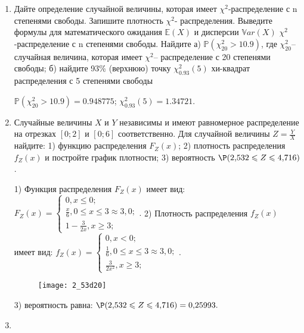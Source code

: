 \documentclass[a4paper,12pt]{article}
\begin{document}
\begin{enumerate}


\item


Дайте определение случайной величины, которая имеет $\chi ^{2}$-распределение с n степенями свободы.
Запишите плотность $\chi ^{2}$- распределения. Выведите формулы для математического ожидания $\mathbb{E}(X)$ и дисперсии $\mathbb{V}ar(X)$ $\chi ^{2}$-распределение с n степенями свободы. Найдите а) $\mathbb{P}(\chi _{20}^{2} > 10.9)$, где $\chi _{20}^{2}$–случайная величина, которая имеет $\chi ^{2}$– распределение с 20 степенями свободы; б) найдите 93\%
(верхнюю) точку $\chi _{0.93}^{2} (5)$ хи-квадрат распределения с 5 степенями свободы




$\mathbb{P}(\chi _{20}^{2} > 10.9) =  0.948775$; $\chi _{0.93}^{2} (5) = 1.34721$.


\item



Случайные величины $X$ и $Y$ независимы и имеют равномерное
распределение на отрезках $[0;2]$ и $[0;6]$ соответственно. Для случайной величины $Z=\frac{Y}{X}$ найдите: 
1) функцию распределения $F_Z(x)$;
2) плотность распределения $f_Z(x)$ и постройте график плотности;
3) вероятность $\P(2,\!532\leqslant Z\leqslant 4,\!716)$.




1) Функция распределения $F_Z(x)$ имеет вид:
$
F_Z(x)=\left\{
\begin{array}{l}
0, x\leqslant 0;\\
\frac{x}{6}, 0\leqslant x\leqslant 3\approx 3,\!0;\\
1 - \frac{3}{2 x}, x\geqslant3;
\end{array}.
\right.
$
2) Плотность распределения $f_Z(x)$ имеет вид:
$
f_Z(x)=\left\{
\begin{array}{l}
0, x<0;\\
\frac{1}{6}, 0\leqslant x\leqslant 3\approx 3,\!0;\\
\frac{3}{2 x^{2}}, x\geqslant3;
\end{array}.
\right.
$


\begin{figure}[H]
    \texttt{[image: 2\_53d20]}
\end{figure}


3) вероятность равна:
$
\P(2,\!532\leqslant Z\leqslant 4,\!716)=
0,\!25993.
$


\item



\end{enumerate}
\end{document}
